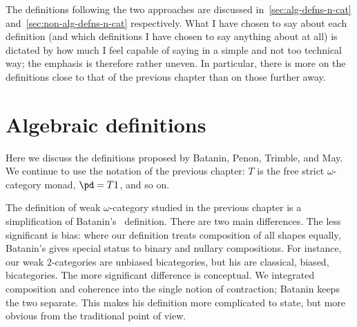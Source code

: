 The definitions following the two approaches are discussed
in~\ref{sec:alg-defns-n-cat} and~\ref{sec:non-alg-defns-n-cat}
respectively.  What I have chosen to say about each definition (and which
definitions I have chosen to say anything about at all) is dictated by how
much I feel capable of saying in a simple and not too technical way; the
emphasis is therefore rather uneven.  In particular, there is more on the
definitions close to that of the previous chapter than on those further
away.  





\section{Algebraic definitions}
%
%
%



Here we discuss the definitions proposed by Batanin, Penon, Trimble, and
May.  We continue to use the notation of the previous chapter: $T$ is the
free strict $\omega$-category monad, $\pd = T1$, and so on.


%
%
%
%
%
%

The definition of weak $\omega$-category studied in the previous chapter is
a simplification of Batanin's~\cite{BatMGC} definition.  There are two main
differences.  The less significant is bias: where our definition treats
composition of all shapes equally, Batanin's gives special status to binary
and nullary compositions.  For instance, our weak $2$-categories are
unbiased bicategories, but his are classical, biased, bicategories.
The more significant difference is conceptual.  We integrated composition%
%
%
%
%
and coherence into the single notion of contraction; Batanin keeps the two
separate.  This makes his definition more complicated to state, but more
obvious from the traditional point of view.

